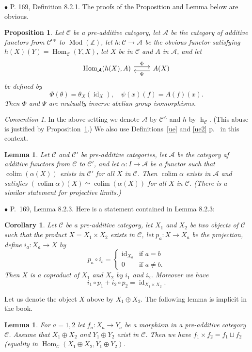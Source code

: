 \documentclass[12pt]{article}
\newtheorem{lem}[thm]{Lemma}
\newtheorem{prop}[thm]{Proposition}
\newtheorem{cor}[thm]{Corollary}
\theoremstyle{remark}%
\newtheorem{conv}[thm]{Convention}%
\newcommand{\bu}{\bullet}
\newcommand{\n}{\noindent}
\newcommand{\bb}{\mathbb}
\newcommand{\A}{\mathcal A}
\newcommand{\C}{\mathcal C}
\DeclareMathOperator*{\co}{colim}
\DeclareMathOperator{\hy}{h}
\DeclareMathOperator{\id}{id}
\DeclareMathOperator{\h}{Hom}
\DeclareMathOperator{\Mod}{Mod}
\DeclareMathOperator{\op}{op}
\begin{document}
\n$\bu$ P. 169, Definition 8.2.1. The proofs of the Proposition and Lemma below are obvious. 
\begin{prop}\label{payp}
Let $\C$ be a pre-additive category, let $\A$ be the category of additive functors from $\C^{\op}$ to $\Mod(\bb Z)$, let $h:\C\to\A$ be the obvious functor satisfying $h(X)(Y)=\h_\C(Y,X)$, let $X$ be in $\C$ and $A$ in $\A$, and let 
$$
\begin{tikzcd}
\h_\A(h(X),A)\ar[yshift=.7ex]{r}{\Phi}&A(X)\ar[yshift=-.7ex]{l}{\Psi}
\end{tikzcd}
$$
be defined by 
$$
\Phi(\theta)=\theta_X(\id_X),\quad\psi(x)(f)=A(f)(x).
$$
Then $\Phi$ and $\Psi$ are mutually inverse abelian group isomorphisms.
\end{prop}
\begin{conv}\label{payc}
In the above setting we denote $\A$ by $\C^\wedge$ and $h$ by $\hy_\C$. (This abuse is justified by Proposition~\ref{payp}.) We also use Definitions~\ref{ue} and \ref{ue2} p.~\pageref{ue} in this context. 
\end{conv} 
\begin{lem}\label{payl}
Let $\C$ and $\C'$ be pre-additive categories, let $\A$ be the category af additive functors from $\C$ to $\C'$, and let $\alpha:I\to\A$ be a functor such that $\co(\alpha(X))$ exists in $\C'$ for all $X$ in $\C$. Then $\co\alpha$ exists in $\A$ and satisfies $(\co\alpha)(X)\simeq\co(\alpha(X))$ for all $X$ in $\C$. (There is a similar statement for projective limits.)
\end{lem}


\n$\bu$ P.~169, Lemma 8.2.3. Here is a statement contained in Lemma 8.2.3:
%
\begin{cor}\label{823}
Let $\C$ be a pre-additive category, let $X_1$ and $X_2$ be two objects of $\C$ such that the product $X=X_1\times X_2$ exists in $\C$, let $p_a:X\to X_a$ be the projection, define $i_a:X_a\to X$ by 
$$
p_a\circ i_b=\begin{cases}\id_{X_a}&\text{if }a=b\\0&\text{if }a\not=b.\end{cases}
$$ 
Then $X$ is a coproduct of $X_1$ and $X_2$ by $i_1$ and $i_2$. Moreover we have 
$$
i_1\circ p_1+i_2\circ p_2=\id_{X_1\times X_2}.
$$
\end{cor}

Let us denote the object $X$ above by $X_1\oplus X_2$. The following lemma is implicit in the book. 

\begin{lem}
For $a=1,2$ let $f_a:X_a\to Y_a$ be a morphism in a pre-additive category $\C$. Assume that $X_1\oplus X_2$ and $Y_1\oplus Y_2$ exist in $\C$. Then we have $f_1\times f_2=f_1\sqcup f_2$ (equality in $\h_\C(X_1\oplus X_2,Y_1\oplus Y_2)$. 
\end{lem} 
\end{document}
